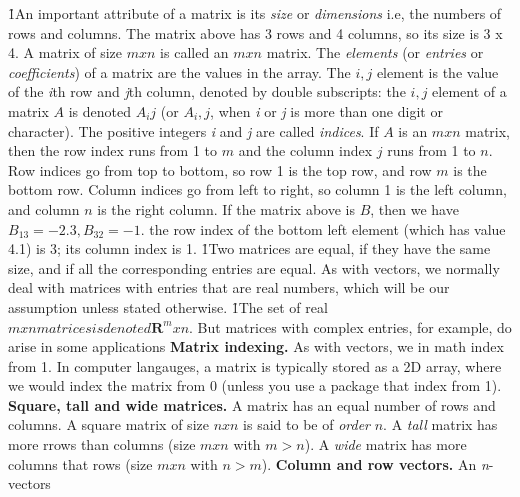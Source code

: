\documentclass{article}
\begin{document}
{{{{{\h1{An important attribute of a matrix is its \textit{size} or \textit{dimensions} i.e, the numbers
of rows and columns.} The matrix above has 3 rows and 4 columns, so its size is 3 x 4.\newline
A matrix of size $m x n$ is called an $m x n$ matrix.\newline
The \textit{elements} (or \textit{entries} or \textit{coefficients}) of a matrix are the values in the array.\newline
The $i,j$ element is the value of the \textit{i}th row and \textit{j}th column, denoted by double subscripts:
the $i,j$ element of a matrix $A$ is denoted $A_ij$ (or $A_i,j$, when \textit{i} or \textit{j} is more than one digit or character).\newline
The positive integers \textit{i} and \textit{j} are called \textit{indices}. \newline
If $A$ is an $m x n$ matrix, then the row index runs from 1 to $m$ and the column index $j$ runs from 1 to $n$.
Row indices go from top to bottom, so row 1 is the top row, and row $m$ is the bottom row. Column indices go from left to right, so column
1 is the left column, and column $n$ is the right column.\newline
If the matrix above is $B$, then we have $B_13 = -2.3, B_32 = -1.$ the row index of the bottom left element (which has value 4.1) is 3;
its column index is 1.\newline
\h1{Two matrices are equal, if they have the same size, and if all the corresponding entries are equal.}\newline
As with vectors, we normally deal with matrices with entries that are real numbers, which will be our assumption unless stated otherwise.
\h1{The set of real $m x n matrices is denoted \textbf{R}^mxn$}. But matrices with complex entries, for example, do arise in some applications
\newline\newline
\textbf{Matrix indexing.} As with vectors, we in math index from 1. In computer langauges, a matrix is typically stored as a 2D array, where we would index the matrix from 0 (unless you use a package that index from 1). 
\newline\newline
\textbf{Square, tall and wide matrices.} A  matrix has an equal number of rows and columns. A square matrix of size $n x n$ is said to be of \textit{order} $n$.
A \textit{tall} matrix has more rrows than columns (size $m x n$ with $m > n$). A \textit{wide} matrix has more columns that rows (size $m x n$ with $n > m$).
\newline\newline
\textbf{Column and row vectors.} An \textit{n}-vectors

}}}}}
\end{document}

